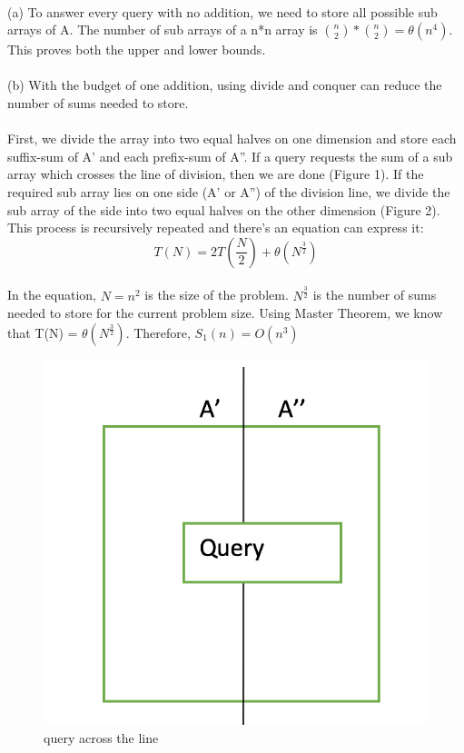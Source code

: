 \begin{problem}{4} ~\\
(a) To answer every query with no addition, we need to store all possible sub arrays of A. The number of sub arrays of a n*n array is $\binom n2 * \binom n2 = \theta(n^4)$. This proves both the upper and lower bounds.\\
\\
(b) With the budget of one addition, using divide and conquer can reduce the number of sums needed to store.\\
\\
First, we divide the array into two equal halves on one dimension and store each suffix-sum of A' and each prefix-sum of A''. If a query requests the sum of a sub array which crosses the line of division, then we are done (Figure 1). If the required sub array lies on one side (A' or A'') of the division line, we divide the sub array of the side into two equal halves on the other dimension (Figure 2). This process is recursively repeated and there's an equation can express it:\\
$$T(N) = 2T(\frac{N}{2}) + \theta(N^\frac{3}{2})$$ \\
In the equation, $N = n^2$ is the size of the problem. $N^\frac{3}{2}$ is the number of sums needed to store for the current problem size. Using Master Theorem, we know that T(N) = $\theta(N^\frac{3}{2})$. Therefore, $S_1(n) = O(n^3)$

\begin{figure}[H] 
\centering 
\includegraphics[width=0.5\columnwidth]{1}
\caption{query across the line}
\end{figure}


\end{problem}
